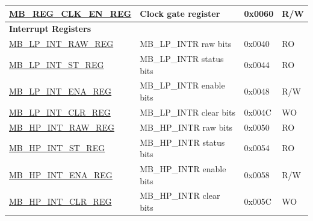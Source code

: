 \begin{longtable}{ | p{6cm} | p{7.2cm} | p{1.3cm} | p{1cm} | }
\hyperref[regdesc:MBREGCLKENREG]{MB\_REG\_CLK\_EN\_REG} & Clock gate register & 0x0060 & R/W \\ \hline
\multicolumn{4}{|l|}{\textbf{Interrupt Registers}} \\ \hline
\hyperref[regdesc:MBLPINTRAWREG]{MB\_LP\_INT\_RAW\_REG} & MB\_LP\_INTR raw bits & 0x0040 & RO \\ \hline
\hyperref[regdesc:MBLPINTSTREG]{MB\_LP\_INT\_ST\_REG} & MB\_LP\_INTR status bits & 0x0044 & RO \\ \hline
\hyperref[regdesc:MBLPINTENAREG]{MB\_LP\_INT\_ENA\_REG} & MB\_LP\_INTR enable bits & 0x0048 & R/W \\ \hline
\hyperref[regdesc:MBLPINTCLRREG]{MB\_LP\_INT\_CLR\_REG} & MB\_LP\_INTR clear bits & 0x004C & WO \\ \hline
\hyperref[regdesc:MBHPINTRAWREG]{MB\_HP\_INT\_RAW\_REG} & MB\_HP\_INTR raw bits & 0x0050 & RO \\ \hline
\hyperref[regdesc:MBHPINTSTREG]{MB\_HP\_INT\_ST\_REG} & MB\_HP\_INTR status bits & 0x0054 & RO \\ \hline
\hyperref[regdesc:MBHPINTENAREG]{MB\_HP\_INT\_ENA\_REG} & MB\_HP\_INTR enable bits & 0x0058 & R/W \\ \hline
\hyperref[regdesc:MBHPINTCLRREG]{MB\_HP\_INT\_CLR\_REG} & MB\_HP\_INTR clear bits & 0x005C & WO \\ \hline
\end{longtable}
